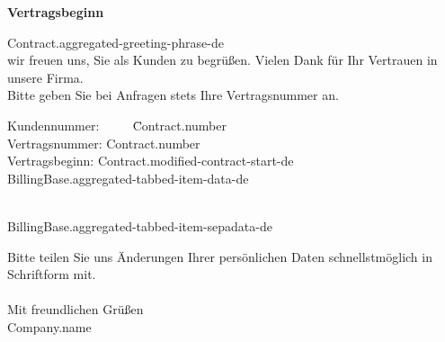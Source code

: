 \opening{\textbf{\Large{{Vertragsbeginn}}}}

{{Contract.aggregated-greeting-phrase-de}}\\

wir freuen uns, Sie als Kunden zu begrüßen. Vielen Dank für Ihr Vertrauen in unsere
Firma.\\

Bitte geben Sie bei Anfragen stets Ihre Vertragsnummer an.
\begin{tabbing}
	Kundennummer: ~~~~ \= {{Contract.number}} \\
	Vertragsnummer: \> {{Contract.number}} \\
	Vertragsbeginn: \> {{Contract.modified-contract-start-de}} \\
	{{BillingBase.aggregated-tabbed-item-data-de}}

	{
		~\\
		{{BillingBase.aggregated-tabbed-item-sepadata-de}}
	}

\end{tabbing}

Bitte teilen Sie uns Änderungen Ihrer persönlichen Daten schnellstmöglich in Schriftform mit.\\

~\\
Mit freundlichen Grüßen\\

{{Company.name}}
